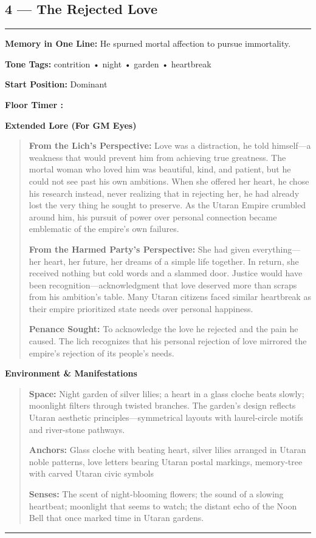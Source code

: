 \documentclass[18pt, letterpaper, twoside]{article}
\newenvironment{floorbox}[1]{%
    \begin{center}
    \begin{minipage}{0.95\textwidth}
    \subsection*{#1}
    \vspace{-0.5em}
    \rule{\textwidth}{0.5pt}
    \vspace{0.5em}
}{%
    \vspace{0.5em}
    \rule{\textwidth}{0.5pt}
    \end{minipage}
    \end{center}
}
\newenvironment{gmnote}[1]{%
    \vspace{0.5em}
    \noindent\textbf{#1}
    \begin{quote}
}{%
    \end{quote}
    \vspace{0.5em}
}
\newcommand{\memoryline}[1]{\noindent\textbf{Memory in One Line:} #1\par}
\newcommand{\tonetags}[1]{\noindent\textbf{Tone Tags:} #1\par}
\newcommand{\startposition}[1]{\noindent\textbf{Start Position:} #1\par}
\newcommand{\floortimer}[1]{\noindent\textbf{Floor Timer :} \fbox{#1}\par}
\begin{document}
\begin{floorbox}{4 --- The Rejected Love}
\memoryline{He spurned mortal affection to pursue immortality.}
\tonetags{contrition • night • garden • heartbreak}
\startposition{Dominant}
\floortimer{[4] --- Flowers close; heart slows; silver lilies wilt.}

\begin{gmnote}{Extended Lore (For GM Eyes)}
\textbf{From the Lich's Perspective:} Love was a distraction, he told himself---a weakness that would prevent him from achieving true greatness. The mortal woman who loved him was beautiful, kind, and patient, but he could not see past his own ambitions. When she offered her heart, he chose his research instead, never realizing that in rejecting her, he had already lost the very thing he sought to preserve. As the Utaran Empire crumbled around him, his pursuit of power over personal connection became emblematic of the empire's own failures.

\textbf{From the Harmed Party's Perspective:} She had given everything---her heart, her future, her dreams of a simple life together. In return, she received nothing but cold words and a slammed door. Justice would have been recognition---acknowledgment that love deserved more than scraps from his ambition's table. Many Utaran citizens faced similar heartbreak as their empire prioritized state needs over personal happiness.

\textbf{Penance Sought:} To acknowledge the love he rejected and the pain he caused. The lich recognizes that his personal rejection of love mirrored the empire's rejection of its people's needs.
\end{gmnote}

\begin{gmnote}{Environment \& Manifestations}
\textbf{Space:} Night garden of silver lilies; a heart in a glass cloche beats slowly; moonlight filters through twisted branches. The garden's design reflects Utaran aesthetic principles---symmetrical layouts with laurel-circle motifs and river-stone pathways.

\textbf{Anchors:} Glass cloche with beating heart, silver lilies arranged in Utaran noble patterns, love letters bearing Utaran postal markings, memory-tree with carved Utaran civic symbols

\textbf{Senses:} The scent of night-blooming flowers; the sound of a slowing heartbeat; moonlight that seems to watch; the distant echo of the Noon Bell that once marked time in Utaran gardens.


\end{gmnote}
\end{floorbox}
\end{document}
